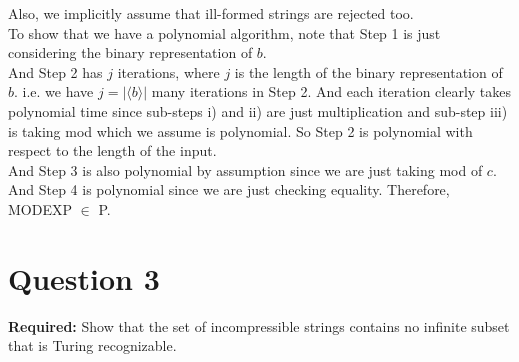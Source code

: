 \documentclass[12pt]{article}
\begin{document}
Also, we implicitly assume that ill-formed strings are rejected too. \\

To show that we have a polynomial algorithm, note that Step 1 is just considering the binary representation of $b$. \\

And Step 2 has $j$ iterations, where $j$ is the length of the binary representation of $b$. i.e. we have $j = |\langle b \rangle|$ many iterations in Step 2. And each iteration clearly takes polynomial time since sub-steps i) and ii) are just multiplication and sub-step iii) is taking mod which we assume is polynomial. So Step 2 is polynomial with respect to the length of the input. \\

And Step 3 is also polynomial by assumption since we are just taking mod of $c$. And Step 4 is polynomial since we are just checking equality. Therefore, MODEXP $\in$ P. 


\newpage

\section*{Question 3}

\textbf{Required:} Show that the set of incompressible strings contains no infinite subset that is Turing recognizable. \\
\end{document}
